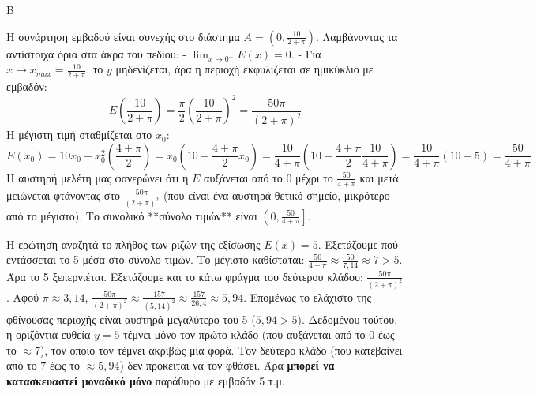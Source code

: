 \begin{thema}{Β}
\begin{erwthma}
\item Η συνάρτηση εμβαδού είναι συνεχής στο διάστημα $A = \left(0, \frac{10}{2+\pi}\right)$.
Λαμβάνοντας τα αντίστοιχα όρια στα άκρα του πεδίου:
- $\lim_{x\to0^+} E(x) = 0$.
- Για $x \to x_{max} = \frac{10}{2+\pi}$, το $y$ μηδενίζεται, άρα η περιοχή εκφυλίζεται σε ημικύκλιο με εμβαδόν:
\[ E\left(\frac{10}{2+\pi}\right) = \frac{\pi}{2} \left( \frac{10}{2+\pi} \right)^2 = \frac{50\pi}{(2+\pi)^2} \]
Η μέγιστη τιμή σταθμίζεται στο $x_0$:
\[ E(x_0) = 10x_0 - x_0^2\left(\frac{4+\pi}{2}\right) = x_0 \left( 10 - \frac{4+\pi}{2} x_0 \right) = \frac{10}{4+\pi} \left( 10 - \frac{4+\pi}{2} \frac{10}{4+\pi} \right) = \frac{10}{4+\pi} (10 - 5) = \frac{50}{4+\pi} \]
Η αυστηρή μελέτη μας φανερώνει ότι η $E$ αυξάνεται από το $0$ μέχρι το $\frac{50}{4+\pi}$ και μετά μειώνεται φτάνοντας στο $\frac{50\pi}{(2+\pi)^2}$ (που είναι ένα αυστηρά θετικό σημείο, μικρότερο από το μέγιστο). Το συνολικό **σύνολο τιμών** είναι $\left(0, \frac{50}{4+\pi}\right]$.

\item Η ερώτηση αναζητά το πλήθος των ριζών της εξίσωσης $E(x) = 5$.
Εξετάζουμε πού εντάσσεται το 5 μέσα στο σύνολο τιμών.
Το μέγιστο καθίσταται: $\frac{50}{4+\pi} \approx \frac{50}{7,14} \approx 7 > 5$. Άρα το 5 ξεπερνιέται.
Εξετάζουμε και το κάτω φράγμα του δεύτερου κλάδου: $\frac{50\pi}{(2+\pi)^2}$. Αφού $\pi \approx 3,14$, $\frac{50\pi}{(2+\pi)^2} \approx \frac{157}{(5,14)^2} \approx \frac{157}{26,4} \approx 5,94$.
Επομένως το ελάχιστο της φθίνουσας περιοχής είναι αυστηρά μεγαλύτερο του 5 ($5,94 > 5$).
Δεδομένου τούτου, η οριζόντια ευθεία $y=5$ τέμνει μόνο τον πρώτο κλάδο (που αυξάνεται από το 0 έως το $\approx 7$), τον οποίο τον τέμνει ακριβώς μία φορά. Τον δεύτερο κλάδο (που κατεβαίνει από το $7$ έως το $\approx 5,94$) δεν πρόκειται να τον φθάσει.
Άρα \textbf{μπορεί να κατασκευαστεί μοναδικό μόνο} παράθυρο με εμβαδόν 5 τ.μ.
\end{erwthma}
\end{thema}

